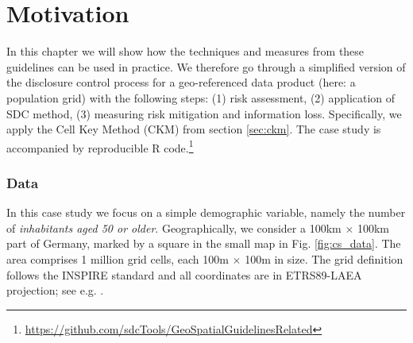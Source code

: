 \section{Motivation}

In this chapter we will show how the techniques and measures from these guidelines can be used in practice.
We therefore go through a simplified version of the disclosure control process for a geo-referenced data product (here: a population grid) with the following steps: (1) risk assessment, (2) application of SDC method, (3) measuring risk mitigation and information loss. Specifically, we apply the Cell Key Method (CKM) from section \ref{sec:ckm}.
The case study is accompanied by reproducible R code.\footnote{
    \url{https://github.com/sdcTools/GeoSpatialGuidelinesRelated}
}

\subsubsection{Data}

In this case study we focus on a simple demographic variable, namely the number of \emph{inhabitants aged 50 or older}. Geographically, we consider a 100km $\times$ 100km part of Germany, marked by a square in the small map in Fig. \ref{fig:cs_data}. The area comprises 1 million grid cells, each 100m $\times$ 100m in size. The grid definition follows the INSPIRE standard \citep{INSPIRE2023} and all coordinates are in ETRS89-LAEA projection; see e.g. \citet{Tsoulos2001}.

